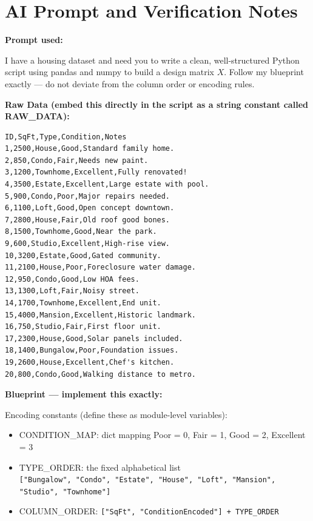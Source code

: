 \documentclass[11pt]{article}
\begin{document}
\section{AI Prompt and Verification Notes}

\textbf{Prompt used:}

I have a housing dataset and need you to write a clean, well-structured Python script using pandas and numpy to build a design matrix $X$. Follow my blueprint exactly --- do not deviate from the column order or encoding rules.

\textbf{Raw Data (embed this directly in the script as a string constant called RAW\_DATA):}

\begin{verbatim}
ID,SqFt,Type,Condition,Notes
1,2500,House,Good,Standard family home.
2,850,Condo,Fair,Needs new paint.
3,1200,Townhome,Excellent,Fully renovated!
4,3500,Estate,Excellent,Large estate with pool.
5,900,Condo,Poor,Major repairs needed.
6,1100,Loft,Good,Open concept downtown.
7,2800,House,Fair,Old roof good bones.
8,1500,Townhome,Good,Near the park.
9,600,Studio,Excellent,High-rise view.
10,3200,Estate,Good,Gated community.
11,2100,House,Poor,Foreclosure water damage.
12,950,Condo,Good,Low HOA fees.
13,1300,Loft,Fair,Noisy street.
14,1700,Townhome,Excellent,End unit.
15,4000,Mansion,Excellent,Historic landmark.
16,750,Studio,Fair,First floor unit.
17,2300,House,Good,Solar panels included.
18,1400,Bungalow,Poor,Foundation issues.
19,2600,House,Excellent,Chef's kitchen.
20,800,Condo,Good,Walking distance to metro.
\end{verbatim}

\textbf{Blueprint --- implement this exactly:}

Encoding constants (define these as module-level variables):

\begin{itemize}
    \item CONDITION\_MAP: dict mapping Poor = 0, Fair = 1, Good = 2, Excellent = 3
    \item TYPE\_ORDER: the fixed alphabetical list \\
    \texttt{["Bungalow", "Condo", "Estate", "House", "Loft", "Mansion", "Studio", "Townhome"]}
    \item COLUMN\_ORDER: \texttt{["SqFt", "ConditionEncoded"] + TYPE\_ORDER}
\end{itemize}
\end{document}
